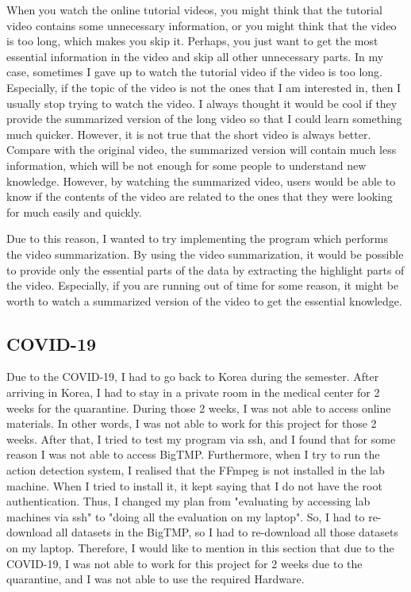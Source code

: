 \documentclass{article}
\begin{document}
When you watch the online tutorial videos, you might think that the tutorial video contains some unnecessary information, or you might think that the video is too long, which makes you skip it. Perhaps, you just want to get the most essential information in the video and skip all other unnecessary parts. In my case, sometimes I gave up to watch the tutorial video if the video is too long. Especially, if the topic of the video is not the ones that I am interested in, then I usually stop trying to watch the video. I always thought it would be cool if they provide the summarized version of the long video so that I could learn something much quicker. However, it is not true that the short video is always better. Compare with the original video, the summarized version will contain much less information, which will be not enough for some people to understand new knowledge. However, by watching the summarized video, users would be able to know if the contents of the video are related to the ones that they were looking for much easily and quickly.

Due to this reason, I wanted to try implementing the program which performs the video summarization. By using the video summarization, it would be possible to provide only the essential parts of the data by extracting the highlight parts of the video. Especially, if you are running out of time for some reason, it might be worth to watch a summarized version of the video to get the essential knowledge.

\subsection{COVID-19}

Due to the COVID-19, I had to go back to Korea during the semester. After arriving in Korea, I had to stay in a private room in the medical center for 2 weeks for the quarantine. During those 2 weeks, I was not able to access online materials. In other words, I was not able to work for this project for those 2 weeks. After that, I tried to test my program via ssh, and I found that for some reason I was not able to access BigTMP. Furthermore, when I try to run the action detection system, I realised that the FFmpeg is not installed in the lab machine. When I tried to install it, it kept saying that I do not have the root authentication. Thus, I changed my plan from "evaluating by accessing lab machines via ssh" to "doing all the evaluation on my laptop". So, I had to re-download all datasets in the BigTMP, so I had to re-download all those datasets on my laptop. Therefore, I would like to mention in this section that due to the COVID-19, I was not able to work for this project for 2 weeks due to the quarantine, and I was not able to use the required Hardware.
\end{document}
